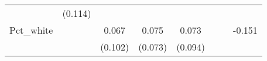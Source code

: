 \documentclass[]{article}
\begin{document}
\begin{longtable}[]{@{}lccccccc@{}}
\begin{minipage}[t]{0.10\columnwidth}
\strut
\end{minipage} & \begin{minipage}[t]{0.10\columnwidth}\centering\strut
(0.114)\strut
\end{minipage}\tabularnewline
\begin{minipage}[t]{0.12\columnwidth}\raggedright\strut
Pct\_white\strut
\end{minipage} & \begin{minipage}[t]{0.09\columnwidth}\centering\strut
\strut
\end{minipage} & \begin{minipage}[t]{0.10\columnwidth}\centering\strut
0.067\strut
\end{minipage} & \begin{minipage}[t]{0.10\columnwidth}\centering\strut
0.075\strut
\end{minipage} & \begin{minipage}[t]{0.10\columnwidth}\centering\strut
0.073\strut
\end{minipage} & \begin{minipage}[t]{0.10\columnwidth}\centering\strut
\strut
\end{minipage} & \begin{minipage}[t]{0.10\columnwidth}\centering\strut
\strut
\end{minipage} & \begin{minipage}[t]{0.10\columnwidth}\centering\strut
-0.151\strut
\end{minipage}\tabularnewline
\begin{minipage}[t]{0.12\columnwidth}\raggedright\strut
\strut
\end{minipage} & \begin{minipage}[t]{0.09\columnwidth}\centering\strut
\strut
\end{minipage} & \begin{minipage}[t]{0.10\columnwidth}\centering\strut
(0.102)\strut
\end{minipage} & \begin{minipage}[t]{0.10\columnwidth}\centering\strut
(0.073)\strut
\end{minipage} & \begin{minipage}[t]{0.10\columnwidth}\centering\strut
(0.094)\strut
\end{minipage} & \begin{minipage}[t]{0.10\columnwidth}\centering\strut
\strut
\end{minipage} & \begin{minipage}[t]{0.10\columnwidth}\centering\strut

\end{minipage}
\end{longtable}
\end{document}
